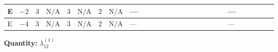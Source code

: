 \documentclass[8pt]{article}
\begin{document}
\begin{landscape}
\begin{longtable}{@{}llcccccc >{\raggedright\arraybackslash}p{0.21\linewidth} >{\raggedright\arraybackslash}p{0.21\linewidth} >{\raggedright\arraybackslash}p{0.21\linewidth}@{}}
\midrule
E & $-2$ & $3$ & $\text{N/A}$ & $3$ & $\text{N/A}$ & $2$ & $\text{N/A}$ & --- & \scriptsize\adjustbox{max width=\linewidth}{$\begin{gathered} +4 {\lambda_{HS_1}^{(1)}} {\lambda_{HS_2}^{(1)}}\end{gathered}$} & --- \\
\midrule
E & $-4$ & $3$ & $\text{N/A}$ & $3$ & $\text{N/A}$ & $2$ & $\text{N/A}$ & --- & \scriptsize\adjustbox{max width=\linewidth}{$\begin{gathered} +4 {\lambda_{HS_1}^{(1)}} {\lambda_{HS_2}^{(1)}}\end{gathered}$} & --- \\
\midrule
\bottomrule
\end{longtable}
\clearpage
\noindent\textbf{Quantity: }$\lambda_{12}^{(1)}$\par\smallskip

\end{landscape}
\end{document}
